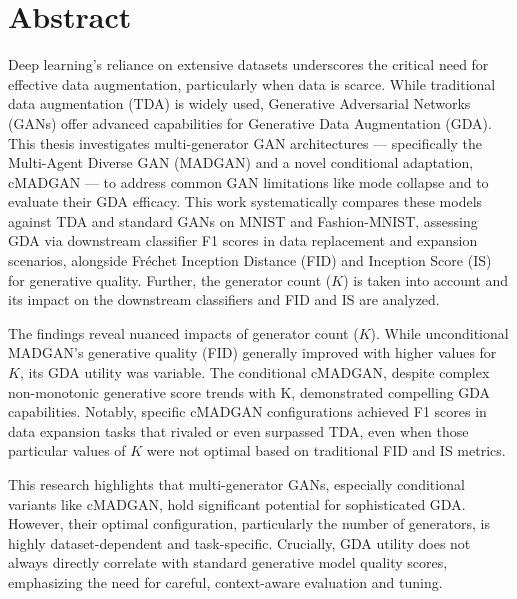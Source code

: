 \section*{Abstract}
\pagestyle{empty}
Deep learning's reliance on extensive datasets underscores the critical need for effective data augmentation, particularly when data is scarce. While traditional data augmentation (TDA) is widely used, Generative Adversarial Networks (GANs) offer advanced capabilities for Generative Data Augmentation (GDA). This thesis investigates multi-generator GAN architectures — specifically the Multi-Agent Diverse GAN (MADGAN) and a novel conditional adaptation, cMADGAN — to address common GAN limitations like mode collapse and to evaluate their GDA efficacy. This work systematically compares these models against TDA and standard GANs on MNIST and Fashion-MNIST, assessing GDA via downstream classifier F1 scores in data replacement and expansion scenarios, alongside Fréchet Inception Distance (FID) and Inception Score (IS) for generative quality. Further, the generator count (\(K\)) is taken into account and its impact on the downstream classifiers and FID and IS are analyzed. 

The findings reveal nuanced impacts of generator count (\(K\)). While unconditional MADGAN's generative quality (FID) generally improved with higher values for \(K\), its GDA utility was variable. The conditional cMADGAN, despite complex non-monotonic generative score trends with K, demonstrated compelling GDA capabilities. Notably, specific cMADGAN configurations achieved F1 scores in data expansion tasks that rivaled or even surpassed TDA, even when those particular values of \(K\) were not optimal based on traditional FID and IS metrics.

This research highlights that multi-generator GANs, especially conditional variants like cMADGAN, hold significant potential for sophisticated GDA. However, their optimal configuration, particularly the number of generators, is highly dataset-dependent and task-specific. Crucially, GDA utility does not always directly correlate with standard generative model quality scores, emphasizing the need for careful, context-aware evaluation and tuning.

